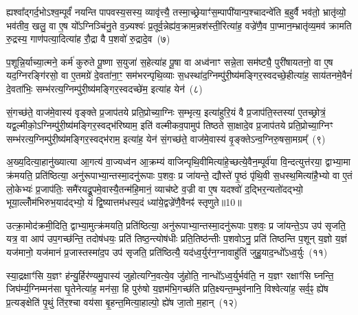 ह्यश्वा᳚द्गर्द॒भो\-ऽश्व॒म्पूर्वं॑ नयन्ति पापवस्य॒सस्य॒ व्यावृ॑त्त्यै॒ तस्मा॒च्छ्रेयाꣳ॑स॒म्पापी॑यान्प॒श्चादन्वे॑ति ब॒हुर्वै भव॑तो॒ भ्रातृ॑व्यो॒ भव॑तीव॒ खलु॒ वा ए॒ष यो᳚\-ऽग्निञ्चि॑नु॒ते व॒ज्र्यश्वः॑ प्र॒तूर्व॒न्नेह्य॑व॒क्राम॒न्नश॑स्ती॒रित्या॑ह॒ वज्रे॑णै॒व पा॒प्मान॒म्भ्रातृ॑व्य॒मव॑ क्रामति रु॒द्रस्य॒ गाण॑पत्या॒दित्या॑ह रौ॒द्रा वै प॒शवो॑ रु॒द्रादे॒व~(७)

प॒शून्नि॒र्याच्या॒त्मने॒ कर्म॑ कुरुते पू॒ष्णा स॒युजा॑ स॒हेत्या॑ह पू॒षा वा अध्व॑नाꣳ सन्ने॒ता सम॑ष्ट्यै॒ पुरी॑षायतनो॒ वा ए॒ष यद॒ग्निरङ्गि॑रसो॒ वा ए॒तमग्रे॑ दे॒वता॑ना॒ꣳ॒ सम॑भरन्पृथि॒व्याः स॒धस्था॑द॒ग्निम्पु॑री॒ष्य॑मङ्गिर॒स्वदच्छे॒हीत्या॑ह॒ साय॑तनमे॒वैनं॑ दे॒वता॑भिः॒ सम्भ॑रत्य॒ग्निम्पु॑री॒ष्य॑मङ्गिर॒स्वदच्छे॑म॒ इत्या॑ह येन॑~(८)

सं॒गच्छ॑ते॒ वाज॑मे॒वास्य॑ वृङ्क्ते प्र॒जाप॑तये प्रति॒प्रोच्या॒ग्निः स॒म्भृत्य॒ इत्या॑हुरि॒यं वै प्र॒जाप॑ति॒स्तस्या॑ ए॒तच्छ्रोत्रं॒ यद्व॒ल्मीको॒\-ऽग्निम्पु॑री॒ष्य॑मङ्गिर॒स्वद्भ॑रिष्याम॒ इति॑ वल्मीकव॒पामुप॑ तिष्ठते सा॒क्षादे॒व प्र॒जाप॑तये प्रति॒प्रोच्या॒ग्निꣳ सम्भ॑रत्य॒ग्निम्पु॑री॒ष्य॑मङ्गिर॒स्वद्भ॑राम॒ इत्या॑ह॒ येन॑ सं॒गच्छ॑ते॒ वाज॑मे॒वास्य॑ वृ॒ङ्क्ते\-ऽन्व॒ग्निरु॒षसा॒मग्रम्᳚~(९)

अ॒ख्य॒दित्या॒हानु॑ख्यात्या आ॒गत्य॑ वा॒ज्यध्व॑न आ॒क्रम्य॑ वाजिन्पृथि॒वीमित्या॑हे॒च्छत्ये॒वैन॒म्पूर्व॑या वि॒न्दत्युत्त॑रया॒ द्वाभ्या॒मा क्र॑मयति॒ प्रति॑ष्ठित्या॒ अनु॑रूपाभ्या॒न्तस्मा॒दनु॑रूपाः प॒शवः॒ प्र जा॑यन्ते॒ द्यौस्ते॑ पृ॒ष्ठं पृ॑थि॒वी स॒धस्थ॒मित्या॑है॒भ्यो वा ए॒तं लो॒केभ्यः॑ प्र॒जाप॑तिः॒ समै॑रयद्रू॒पमे॒वास्यै॒तन्म॑हि॒मानं॒ व्याच॑ष्टे व॒ज्री वा ए॒ष यदश्वो॑ द॒द्भिर॒न्यतो॑दद्भ्यो॒ भूया॒ल्लोँम॑भिरुभ॒याद॑द्भ्यो॒ यं द्वि॒ष्यात्तम॑धस्प॒दं ध्या॑ये॒द्वज्रे॑णै॒वैनꣴ॑ स्तृणुते॥10॥

{\anuvakamend[{आ॒ह॒ पापी॑यान्रु॒द्रादे॒व येनाग्रं॑ व॒ज्री वै स॒प्तद॑श च}]}%

उत्क्रा॒मोद॑क्रमी॒दिति॒ द्वाभ्या॒मुत्क्र॑मयति॒ प्रति॑ष्ठित्या॒ अनु॑रूपाभ्या॒न्तस्मा॒दनु॑रूपाः प॒शवः॒ प्र जा॑यन्ते॒\-ऽप उप॑ सृजति॒ यत्र॒ वा आप॑ उप॒गच्छ॑न्ति॒ तदोष॑धयः॒ प्रति॑ तिष्ठ॒न्त्योष॑धीः प्रति॒तिष्ठ॑न्तीः प॒शवो\-ऽनु॒ प्रति॑ तिष्ठन्ति प॒शून् य॒ज्ञो य॒ज्ञं यज॑मानो॒ यज॑मानं प्र॒जास्तस्मा॑द॒प उप॑ सृजति॒ प्रति॑ष्ठित्यै॒ यद॑ध्व॒र्युर॑न॒ग्नावाहु॑तिं जुहु॒याद॒न्धो᳚\-ऽध्व॒र्युः~(११)

स्या॒द्रक्षाꣳ॑सि य॒ज्ञꣳ ह॑न्यु॒र्\mbox{}हिर॑ण्यमु॒पास्य॑ जुहोत्यग्नि॒वत्ये॒व जु॑होति॒ नान्धो᳚\-ऽध्व॒र्युर्भव॑ति॒ न य॒ज्ञꣳ रक्षाꣳ॑सि घ्नन्ति॒ जिघ॑र्म्य॒ग्निम्मन॑सा घृ॒तेनेत्या॑ह॒ मन॑सा॒ हि पुरु॑षो य॒ज्ञम॑भि॒गच्छ॑ति प्रति॒क्ष्यन्त॒म्भुव॑नानि॒ विश्वेत्या॑ह॒ सर्व॒ꣴ॒ ह्ये॑ष प्र॒त्यङ्क्षेति॑ पृ॒थुं ति॑र॒श्चा वय॑सा बृ॒हन्त॒मित्या॒हाल्पो॒ ह्ये॑ष जा॒तो म॒हान्~(१२)

